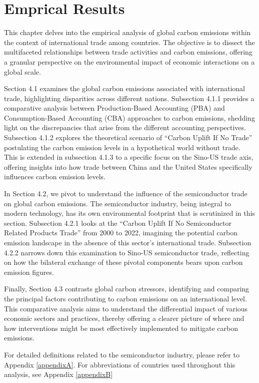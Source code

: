 \chapter{Emprical Results}
\label{chap:EMPRICAL RESULTS}
This chapter delves into the empirical analysis of global carbon emissions within the context of international trade among countries. The objective is to dissect the multifaceted relationships between trade activities and carbon emissions, offering a granular perspective on the environmental impact of economic interactions on a global scale.

Section 4.1 examines the global carbon emissions associated with international trade, highlighting disparities across different nations. Subsection 4.1.1 provides a comparative analysis between Production-Based Accounting (PBA) and Consumption-Based Accounting (CBA) approaches to carbon emissions, shedding light on the discrepancies that arise from the different accounting perspectives. Subsection 4.1.2 explores the theoretical scenario of ``Carbon Uplift If No Trade'' postulating the carbon emission levels in a hypothetical world without trade. This is extended in subsection 4.1.3 to a specific focus on the Sino-US trade axis, offering insights into how trade between China and the United States specifically influences carbon emission levels.

In Section 4.2, we pivot to understand the influence of the semiconductor trade on global carbon emissions. The semiconductor industry, being integral to modern technology, has its own environmental footprint that is scrutinized in this section. Subsection 4.2.1 looks at the ``Carbon Uplift If No Semiconductor Related Products Trade'' from 2000 to 2022, imagining the potential carbon emission landscape in the absence of this sector's international trade. Subsection 4.2.2 narrows down this examination to Sino-US semiconductor trade, reflecting on how the bilateral exchange of these pivotal components bears upon carbon emission figures.

Finally, Section 4.3 contrasts global carbon stressors, identifying and comparing the principal factors contributing to carbon emissions on an international level. This comparative analysis aims to understand the differential impact of various economic sectors and practices, thereby offering a clearer picture of where and how interventions might be most effectively implemented to mitigate carbon emissions.

For detailed definitions related to the semiconductor industry, please refer to Appendix \ref{appendixA}. For abbreviations of countries used throughout this analysis, see Appendix \ref{appendixB}

